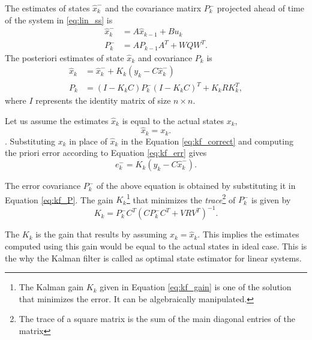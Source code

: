 The estimates of states $\hat x_k^-$ and the covariance matirx $P_k^{-}$ projected ahead of time of the system in \ref{eq:lin_ss} is
\begin{equation}
	\begin{split}
	\hat{x}_k^{-} &= A \hat x_{k-1} + B u_k \\
	P_k^- &= A P_{k-1} A^{T} + W Q W^T .
	\end{split}
\end{equation}
The posteriori estimates of state $\hat x_k$ and covariance $P_k$ is
\begin{equation} 
	\label{eq:kf_correct}
	\begin{split}
	\hat{x}_k &= \hat{x}_k^{-} + K_k(y_k - C\hat x_k^{-})\\
    {P}_{k} &= (I - {K}_k {C}) {P}_{k}^{-} (I - {K}_k {C})^{T} + {K}_k {R} {K}_k^{T},
	\end{split}
\end{equation}
where $I$ represents the identity matrix of size $n \times n$.

Let us assume the estimates $\hat x_k$ is equal to the actual states $x_k$, $$\hat{x}_k = x_k.$$. 
Substituting $x_k$ in place of $\hat x_k$ in the Equation \ref{eq:kf_correct} and computing the priori error according to Equation \ref{eq:kf_err} gives
\begin{equation}
	e_k^- =  K_k(y_k - C\hat x_k^-).
\end{equation}

The error covariance $P_k^-$ of the above equation is obtained by substituting it in Equation \ref{eq:kf_P}. The gain $K_k$\footnote{The Kalman gain $K_k$ given in Equation \ref{eq:kf_gain} is one of the solution that minimizes the error. It can be algebraically manipulated.} that minimizes the \emph{trace}\footnote{The trace of a square matrix is the sum of the main diagonal entries of the matrix} of $P_k^-$ is given by
\begin{equation} \label{eq:kf_gain}
 K_k = P_k^- C^T(C P_k^- C^T + V R V^T)^{-1}.
    \end{equation}

The $K_k$ is the gain that results by assuming $x_k=\hat x_k$. This implies the estimates computed using this gain would be equal to the actual states in ideal case. This is the why the Kalman filter is called as optimal state estimator for linear systems.

